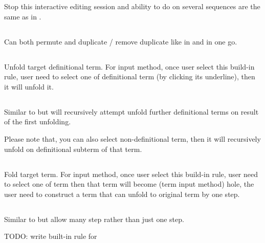 Stop this interactive editing session and ability to do on several sequences are the same as in .

\subsection{}
Can both permute and duplicate / remove duplicate like in  and  in one go.


\subsection{}
Unfold target definitional term. For input method, once user select this build-in rule, user need to select one of definitional term (by clicking its underline), then it will unfold it.


\subsection{}
Similar to  but will recursively attempt unfold further definitional terms on result of the first unfolding.

Please note that, you can also select non-definitional term, then it will recursively unfold on definitional subterm of that term.

\subsection{}
Fold target term. For input method, once user select this build-in rule, user need to select one of term then that term will become (term input method) hole, the user need to construct a term that can unfold to original term by one step.

\subsection{}
Similar to  but allow many step rather than just one step.

TODO: write built-in rule for \kDictionary
